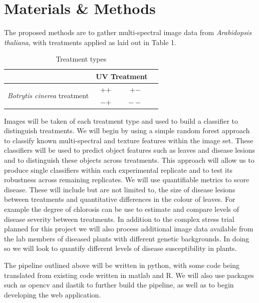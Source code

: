 \documentclass[a4paper]{article}
\begin{document}
    
    
	\section{Materials \& Methods}   
	
	The proposed methods are to gather multi-spectral image data from \textit{Arabidopsis thaliana}, with treatments applied as laid out in
	Table 1.
    
    
  \begin{table}
  \caption{Treatment types}
  \begin{tabular}{|c|c|c|c|}
  \hline \cline{2-4}
    & \multicolumn{2}{|c|}{UV Treatment}\\
    \hline
    \multirow{2}{8em}{\textit{Botrytis cinerea} treatment} & ++ & +$-$\\
    & $-$+ & $--$\\
    \hline
  \end{tabular}
  \end{table}

	Images will be taken of each treatment type and used to build a classifier to distinguish treatments.
	We will begin by using a simple random forest approach to classify known multi-spectral and texture features within
	the image set. These classifiers will be used to predict object features such as leaves and disease lesions and to
	distinguish these objects across treatments. This approach will allow us to produce single classifiers within each
	experimental replicate and to test its robustness across remaining replicates. We will use quantifiable metrics to
	score disease. These will include but are not limited to, the size of disease lesions between treatments and
	quantitative differences in the colour of leaves. For example the degree of chlorosis can be use to estimate and
	compare levels of disease severity between treatments. In addition to the complex stress trial planned for this
	project we will also process additional image data available from the lab members of diseased plants with different
	genetic backgrounds. In doing so we will look to quantify different levels of disease susceptibility in plants. 
	
	The pipeline outlined above will be written in python, with some code being translated from existing code 
    written in matlab and R. We will also use packages such as opencv and ilastik to further build the pipeline, as well
    as to begin developing the web application.
    
\end{document}
